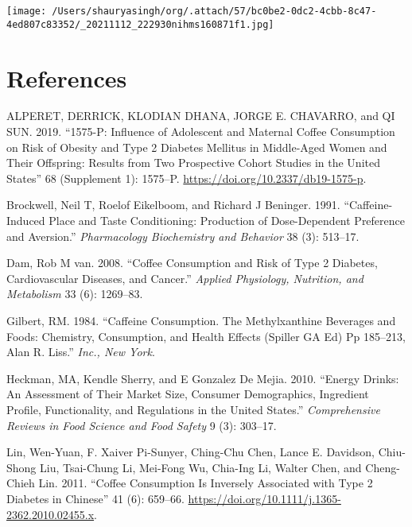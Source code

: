 \documentclass{scrartcl}
\begin{document}
\begin{center}
\texttt{[image: /Users/shauryasingh/org/.attach/57/bc0be2-0dc2-4cbb-8c47-4ed807c83352/\_20211112\_222930nihms160871f1.jpg]}
\end{center}


\section*{References}
\label{sec:org43bbf69}
\begin{hangparas}{1.5em}{1}
\hypertarget{citeproc_bib_item_1}{ALPERET, DERRICK, KLODIAN DHANA, JORGE E. CHAVARRO, and QI SUN. 2019. “1575-P: Influence of Adolescent and Maternal Coffee Consumption on Risk of Obesity and Type 2 Diabetes Mellitus in Middle-Aged Women and Their Offspring: Results from Two Prospective Cohort Studies in the United States” 68 (Supplement 1): 1575–P. \href{https://doi.org/10.2337/db19-1575-p}{https://doi.org/10.2337/db19-1575-p}.}

\hypertarget{citeproc_bib_item_2}{Brockwell, Neil T, Roelof Eikelboom, and Richard J Beninger. 1991. “Caffeine-Induced Place and Taste Conditioning: Production of Dose-Dependent Preference and Aversion.” \textit{Pharmacology Biochemistry and Behavior} 38 (3): 513–17.}

\hypertarget{citeproc_bib_item_3}{Dam, Rob M van. 2008. “Coffee Consumption and Risk of Type 2 Diabetes, Cardiovascular Diseases, and Cancer.” \textit{Applied Physiology, Nutrition, and Metabolism} 33 (6): 1269–83.}

\hypertarget{citeproc_bib_item_4}{Gilbert, RM. 1984. “Caffeine Consumption. The Methylxanthine Beverages and Foods: Chemistry, Consumption, and Health Effects (Spiller GA Ed) Pp 185–213, Alan R. Liss.” \textit{Inc., New York}.}

\hypertarget{citeproc_bib_item_5}{Heckman, MA, Kendle Sherry, and E Gonzalez De Mejia. 2010. “Energy Drinks: An Assessment of Their Market Size, Consumer Demographics, Ingredient Profile, Functionality, and Regulations in the United States.” \textit{Comprehensive Reviews in Food Science and Food Safety} 9 (3): 303–17.}

\hypertarget{citeproc_bib_item_6}{Lin, Wen-Yuan, F. Xaiver Pi-Sunyer, Ching-Chu Chen, Lance E. Davidson, Chiu-Shong Liu, Tsai-Chung Li, Mei-Fong Wu, Chia-Ing Li, Walter Chen, and Cheng-Chieh Lin. 2011. “Coffee Consumption Is Inversely Associated with Type 2 Diabetes in Chinese” 41 (6): 659–66. \href{https://doi.org/10.1111/j.1365-2362.2010.02455.x}{https://doi.org/10.1111/j.1365-2362.2010.02455.x}.}


\end{hangparas}
\end{document}
